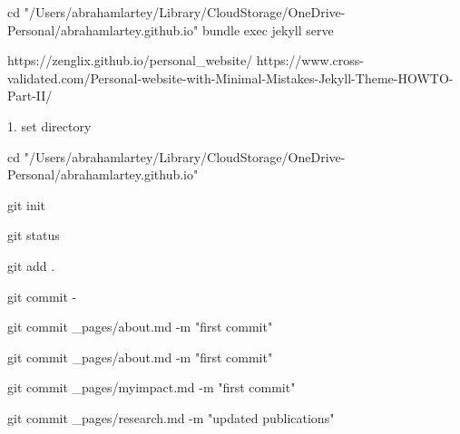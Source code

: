 cd "/Users/abrahamlartey/Library/CloudStorage/OneDrive-Personal/abrahamlartey.github.io"
bundle exec jekyll serve

https://zenglix.github.io/personal_website/
https://www.cross-validated.com/Personal-website-with-Minimal-Mistakes-Jekyll-Theme-HOWTO-Part-II/



1. set directory

cd "/Users/abrahamlartey/Library/CloudStorage/OneDrive-Personal/abrahamlartey.github.io"

git init

git status

git add .

git commit -

git commit _pages/about.md -m  "first commit"

git commit _pages/about.md -m  "first commit"

git commit  _pages/myimpact.md -m  "first commit"

git commit _pages/research.md -m  "updated publications"
